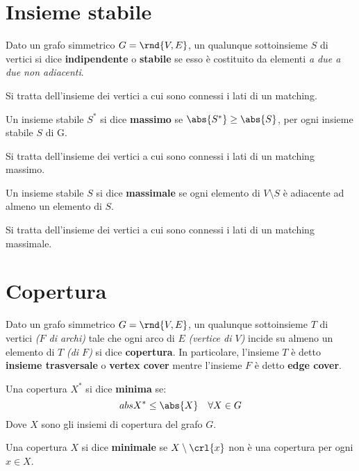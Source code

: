 \documentclass[\main/main.tex]{subfiles}
\begin{document}
\section{Insieme stabile}
\begin{definition}
	Dato un grafo simmetrico \(G=\rnd{V, E}\), un qualunque sottoinsieme \(S\) di vertici si dice \textbf{indipendente} o \textbf{stabile} se esso è costituito da elementi \textit{a due a due non adiacenti}.

	Si tratta dell'insieme dei vertici a cui sono connessi i lati di un matching.
\end{definition}
\begin{definition}
	Un insieme stabile \(S^*\) si dice \textbf{massimo} se \(\abs{S^*} \geq \abs{S}\), per ogni insieme stabile \(S\) di G.

	Si tratta dell'insieme dei vertici a cui sono connessi i lati di un matching massimo.
\end{definition}
\begin{definition}
	Un insieme stabile \(S\) si dice \textbf{massimale} se ogni elemento di \(V\setminus S\) è adiacente ad almeno un elemento di \(S\).

	Si tratta dell'insieme dei vertici a cui sono connessi i lati di un matching massimale.
\end{definition}

\section{Copertura}
\begin{definition}[Copertura]
	Dato un grafo simmetrico \(G = \rnd{V, E}\), un qualunque sottoinsieme \(T\) di vertici \textit{(\(F\) di archi)} tale che ogni arco di \(E\) \textit{(vertice di \(V\))} incide su almeno un elemento di \(T\) \textit{(di \(F\))} si dice \textbf{copertura}. In particolare, l'insieme \(T\) è detto \textbf{insieme trasversale} o \textbf{vertex cover} mentre l'insieme \(F\) è detto \textbf{edge cover}.
\end{definition}
\begin{definition}
	Una copertura \(X^*\) si dice \textbf{minima} se:
	\[abs{X^*} \leq \abs{X} \quad \forall X \in G\]
	Dove \(X\) sono gli insiemi di copertura del grafo \(G\).
\end{definition}
\begin{definition}
	Una copertura \(X\) si dice \textbf{minimale} se \(X \setminus \crl{x}\) non è una copertura per ogni \(x \in X\).
\end{definition}
\end{document}

